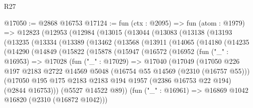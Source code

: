 \begin{lexlean}{R27}
\begin{coremodule}
@17050 := @2868 @16753
@17124 := fun (ctx : @2095) =>
  fun (atom : @1979) =>
  @12823
    (@12953
      (@12984
        (@13015
          (@13044
            (@13083
              (@13138
                (@13193
                  (@13235
                    (@13334
                      (@13389
                        (@13462
                          (@13568
                            (@13911
                              (@14065
                                (@14180
                                  (@14235
                                    (@14290
                                      (@14849
                                        (@15822
                                          (@15878
                                            (@15947
                                              (@16572
                                                (@16952
                                                  (fun ("_" : @16953) =>
                                                  @17028
                                                    (fun ("_" : @17029) =>
                                                    @17040
                                                      (@17049
                                                        (@17050
                                                          @226
                                                          @197
                                                          @2183
                                                          @2722
                                                          @14569
                                                          @5048
                                                          (@16754 @55 @14569 (@2310 (@16757 @55)))
                                                          (@17050
                                                            @195
                                                            @175
                                                            @2183
                                                            @2183
                                                            @194
                                                            @1957
                                                            (@2386 @16753 @22 @194)
                                                            (@2844 @16753)))
                                                        (@5527 @14522 @89))
                                                      (fun ("_" : @16961) =>
                                                      @16869 @1042 @16820 (@2310 (@16872 @1042)))

\end{coremodule}
\end{lexlean}
